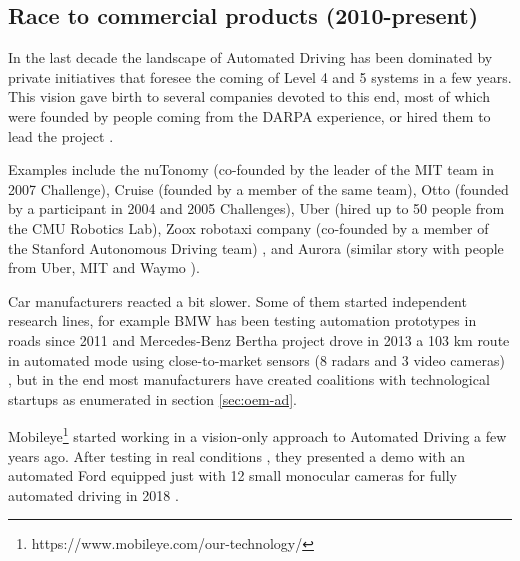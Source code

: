 \subsection{Race to commercial products (2010-present)}
 
In the last decade the landscape of Automated Driving has been dominated by 
private initiatives that foresee the coming of Level 4 and 5 systems in a few 
years. This vision gave birth to several companies devoted to this end, most of 
which were founded by people coming from the DARPA experience, or hired them to
lead the project \cite{Chapell2016}. 

Examples include the nuTonomy (co-founded
by the leader of the MIT team in 2007 Challenge), Cruise (founded by a 
member of the same team), Otto (founded by a participant in 2004 and 2005 
Challenges), Uber (hired up to 50 people from the CMU Robotics Lab),  
Zoox robotaxi company (co-founded by a member of the Stanford 
Autonomous Driving team) %
\cite{Levinson2011a}, and Aurora (similar story with people from 
Uber, MIT and Waymo \cite{Anderson2013}).

Car manufacturers reacted a bit slower. 
Some of them started independent research lines, for example
BMW has been testing automation prototypes in roads since 2011 
\cite{Aeberhard2015a} and Mercedes-Benz Bertha project \cite{Ziegler2014}
drove in 2013 a 103 km route in automated
mode using close-to-market sensors (8 radars and 3 video cameras)
, but in the end most manufacturers have created coalitions with technological
startups as enumerated in section \ref{sec:oem-ad}.


Mobileye\footnote{https://www.mobileye.com/our-technology/} 
started working in a vision-only approach to Automated Driving
a few years ago. 
After testing in real conditions \cite{Edelstein2018}, they presented a demo with an automated Ford equipped just with 12 small monocular cameras for fully automated driving in 2018 \cite{Scheer2018}.

